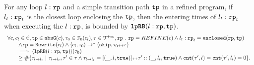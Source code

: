 
\begin{lemma}
    For any loop $l: \mathtt{rp}$ and a simple transition path $\mathtt{tp}$ in a refined program, if $l_t: \mathtt{rp}_t$ is the closest loop enclosing the $\mathtt{tp}$, then the entering times of $l_t: \mathtt{rp}_t$ when executing the $l: \mathtt{rp}$, is bounded by $\mathtt{lpRB}(l: \mathtt{rp}, \mathtt{tp})$.
    \[
      \begin{array}{l}
      \forall c, c_l \in \cdom, \tpath \in \absG(c), \trace_0 \in \tdom_0(c_l), \trace \in \inftdom, \rprog \st 
      \rprog = REFINE(c)
      \land
      l_t: \rprog_t = \kw{enclosed}(\rprog, \tpath)
      \\ \qquad
      \land 
      \rprog = \algrewrite(c_l)
      \land
      \config{c_l, \trace_0} \to^* 
      \config{\eskip, \trace_0 \tracecat \trace}
      \\ \qquad
      \implies
      \config{\lpchB(l: \rprog, \tpath)}(\trace_0) 
      \\ \qquad \geq 
      \# \left\{\trace_{l \to l_t} ~\vert~ \trace_{l \to l_t}, \trace' \in \trace \land \trace_{l \to l_t} = [(\_, l, \etrue)] \tracecat \trace' :: (\_, l_t, \etrue)
      \land \counter(\trace', l) = \counter(\trace', l_t) = 0 
      \right\}.
      \end{array}
    \]  
  \end{lemma}
